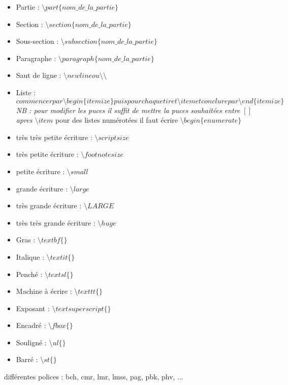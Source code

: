 \begin{itemize}
\item Partie : $ \setminus part\lbrace \textit{nom\_ de\_ la\_ partie} \rbrace $

\item Section : $ \setminus section\lbrace \textit{nom\_ de\_ la\_ partie}\rbrace $

\item Sous-section : $ \setminus subsection\lbrace \textit{nom\_ de\_ la\_ partie} \rbrace $

\item Paragraphe : $ \setminus paragraph\lbrace \textit{nom\_ de\_ la\_ partie}\rbrace $

\item Saut de ligne : $ \setminus newline ou \setminus \setminus $

\item Liste : $ commencer par \setminus begin \lbrace itemize \rbrace puis pour chaque tiret \setminus item et conclure
par \setminus end\lbrace itemize \rbrace $ \textit{ NB : pour modifier les puces il suffit de mettre la puces souhaitées
entre $ [  ] $ apres $ \setminus item $}
\newline pour des listes numérotées il faut écrire $\setminus begin\lbrace enumerate\rbrace $

\item très très petite écriture : $ \setminus scriptsize $

\item très petite écriture : $ \setminus footnotesize $

\item petite écriture : $ \setminus small $

\item grande écriture : $ \setminus large$

\item très grande écriture : $ \setminus LARGE $

\item très très grande écriture : $ \setminus huge $

\item Gras :  $ \setminus textbf\lbrace\rbrace $
\item Italique :  $ \setminus textit\lbrace\rbrace $
\item Penché :  $ \setminus textsl\lbrace\rbrace $
\item Machine à écrire :  $ \setminus texttt\lbrace\rbrace $
\item Exposant :  $ \setminus textsuperscript\lbrace\rbrace $
\item Encadré :  $ \setminus fbox\lbrace\rbrace $
\item Souligné :  $ \setminus ul\lbrace\rbrace $
\item Barré :  $ \setminus st\lbrace\rbrace $
\end{itemize}

différentes polices : bch, cmr, lmr, lmss, pag, pbk, phv, ...

